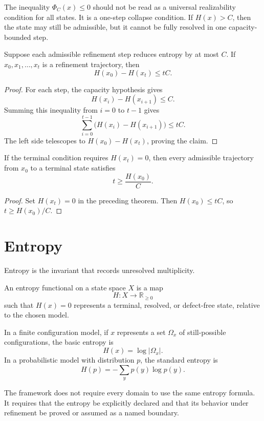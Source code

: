 The inequality \(\Phi_C(x)\le 0\) should not be read as a universal
realizability condition for all states. It is a one-step collapse condition.
If \(H(x)>C\), then the state may still be admissible, but it cannot be fully
resolved in one capacity-bounded step.

\begin{theorem}
Suppose each admissible refinement step reduces entropy by at most \(C\). If
\(x_0,x_1,\ldots,x_t\) is a refinement trajectory, then
\[
H(x_0)-H(x_t)\le tC.
\]
\end{theorem}

\begin{proof}
For each step, the capacity hypothesis gives
\[
H(x_i)-H(x_{i+1})\le C.
\]
Summing this inequality from \(i=0\) to \(t-1\) gives
\[
\sum_{i=0}^{t-1}\bigl(H(x_i)-H(x_{i+1})\bigr)\le tC.
\]
The left side telescopes to \(H(x_0)-H(x_t)\), proving the claim.
\end{proof}

\begin{theorem}
If the terminal condition requires \(H(x_t)=0\), then every admissible
trajectory from \(x_0\) to a terminal state satisfies
\[
t\ge \frac{H(x_0)}{C}.
\]
\end{theorem}

\begin{proof}
Set \(H(x_t)=0\) in the preceding theorem. Then \(H(x_0)\le tC\), so
\(t\ge H(x_0)/C\).
\end{proof}

\section{Entropy}

Entropy is the invariant that records unresolved multiplicity.

\begin{definition}
An entropy functional on a state space \(X\) is a map
\[
H:X\to\mathbb R_{\ge 0}
\]
such that \(H(x)=0\) represents a terminal, resolved, or defect-free state,
relative to the chosen model.
\end{definition}

In a finite configuration model, if \(x\) represents a set \(\Omega_x\) of
still-possible configurations, the basic entropy is
\[
H(x)=\log |\Omega_x|.
\]
In a probabilistic model with distribution \(p\), the standard entropy is
\[
H(p)=-\sum_y p(y)\log p(y).
\]

The framework does not require every domain to use the same entropy formula.
It requires that the entropy be explicitly declared and that its behavior under
refinement be proved or assumed as a named boundary.


